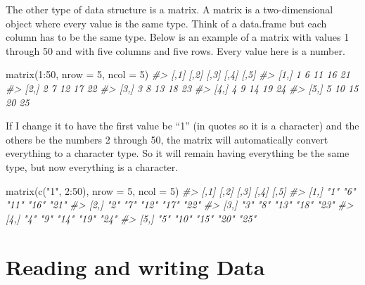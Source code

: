 \documentclass[
]{krantz}
\makeatletter
\newenvironment{Shaded}{\begin{snugshade}}{\end{snugshade}}
\newcommand{\AttributeTok}[1]{\textcolor[rgb]{0.61,0.61,0.61}{#1}}
\newcommand{\CommentTok}[1]{\textcolor[rgb]{0.37,0.37,0.37}{\textit{#1}}}
\newcommand{\DecValTok}[1]{\textcolor[rgb]{0.06,0.06,0.06}{#1}}
\newcommand{\FunctionTok}[1]{\textcolor[rgb]{0,0,0}{#1}}
\newcommand{\NormalTok}[1]{#1}
\newcommand{\SpecialCharTok}[1]{\textcolor[rgb]{0,0,0}{#1}}
\newcommand{\StringTok}[1]{\textcolor[rgb]{0.5,0.5,0.5}{#1}}
\newenvironment{kframe}{%
\medskip{}
\setlength{\fboxsep}{.8em}
 \def\at@end@of@kframe{}%
 \ifinner\ifhmode%
  \def\at@end@of@kframe{\end{minipage}}%
  \begin{minipage}{\columnwidth}%
 \fi\fi%
 \def\FrameCommand##1{\hskip\@totalleftmargin \hskip-\fboxsep
 \colorbox{shadecolor}{##1}\hskip-\fboxsep
     \hskip-\linewidth \hskip-\@totalleftmargin \hskip\columnwidth}%
 \MakeFramed {\advance\hsize-\width
   \@totalleftmargin\z@ \linewidth\hsize
   \@setminipage}}%
 {\par\unskip\endMakeFramed%
 \at@end@of@kframe}
\renewenvironment{Shaded}{\begin{kframe}}{\end{kframe}}
\makeatother
\begin{document}
The other type of data structure is a matrix. A matrix is a
two-dimensional object where every value is the same type.
Think of a data.frame but each column has to be the same
type. Below is an example of a matrix with values 1 through
50 and with five columns and five rows. Every value here is
a number.

\begin{Shaded}
\begin{Highlighting}[]
\FunctionTok{matrix}\NormalTok{(}\DecValTok{1}\SpecialCharTok{:}\DecValTok{50}\NormalTok{, }\AttributeTok{nrow =} \DecValTok{5}\NormalTok{, }\AttributeTok{ncol =} \DecValTok{5}\NormalTok{)}
\CommentTok{\#\textgreater{}      [,1] [,2] [,3] [,4] [,5]}
\CommentTok{\#\textgreater{} [1,]    1    6   11   16   21}
\CommentTok{\#\textgreater{} [2,]    2    7   12   17   22}
\CommentTok{\#\textgreater{} [3,]    3    8   13   18   23}
\CommentTok{\#\textgreater{} [4,]    4    9   14   19   24}
\CommentTok{\#\textgreater{} [5,]    5   10   15   20   25}
\end{Highlighting}
\end{Shaded}

If I change it to have the first value be ``1'' (in quotes
so it is a character) and the others be the numbers 2
through 50, the matrix will automatically convert everything
to a character type. So it will remain having everything be
the same type, but now everything is a character.

\begin{Shaded}
\begin{Highlighting}[]
\FunctionTok{matrix}\NormalTok{(}\FunctionTok{c}\NormalTok{(}\StringTok{"1"}\NormalTok{, }\DecValTok{2}\SpecialCharTok{:}\DecValTok{50}\NormalTok{), }\AttributeTok{nrow =} \DecValTok{5}\NormalTok{, }\AttributeTok{ncol =} \DecValTok{5}\NormalTok{)}
\CommentTok{\#\textgreater{}      [,1] [,2] [,3] [,4] [,5]}
\CommentTok{\#\textgreater{} [1,] "1"  "6"  "11" "16" "21"}
\CommentTok{\#\textgreater{} [2,] "2"  "7"  "12" "17" "22"}
\CommentTok{\#\textgreater{} [3,] "3"  "8"  "13" "18" "23"}
\CommentTok{\#\textgreater{} [4,] "4"  "9"  "14" "19" "24"}
\CommentTok{\#\textgreater{} [5,] "5"  "10" "15" "20" "25"}
\end{Highlighting}
\end{Shaded}

\hypertarget{reading-and-writing-data}{%
\chapter{Reading and writing
Data}\label{reading-and-writing-data}}
\end{document}
